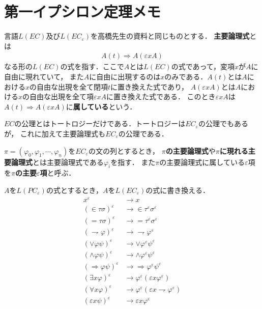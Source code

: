 \section{第一イプシロン定理メモ}
	
	言語$L(EC)$及び$L(EC_{\varepsilon})$を高橋先生の資料と同じものとする．
	{\bf 主要論理式}とは
	\begin{align}
		A(t) \Longrightarrow A(\varepsilon x A)
	\end{align}
	なる形の$L(EC)$の式を指す．ここで$A$とは$L(EC)$の式であって，変項$x$が$A$に自由に現れていて，
	また$A$に自由に出現するのは$x$のみである．$A(t)$とは$A$における$x$の自由な出現を全て閉項$t$に置き換えた式であり，
	$A(\varepsilon x A)$とは$A$における$x$の自由な出現を全て項$\varepsilon x A$に置き換えた式である．
	このとき$\varepsilon x A$は$A(t) \Longrightarrow A(\varepsilon x A)$に{\bf 属している}という．
	
	$EC$の公理とはトートロジーだけである．トートロジーは$EC_{\varepsilon}$の公理でもあるが，
	これに加えて主要論理式も$EC_{\varepsilon}$の公理である．
	
	$\pi = (\varphi_{0},\varphi_{1},\cdots,\varphi_{n})$を$EC_{\varepsilon}$の文の列とするとき，
	{\bf $\pi$の主要論理式}や{\bf $\pi$に現れる主要論理式}とは主要論理式である$\varphi_{i}$を指す．
	また$\pi$の主要論理式に属している$\varepsilon$項を{\bf $\pi$の主要$\varepsilon$項}と呼ぶ．
	
	$A$を$L(PC_{\varepsilon})$の式とするとき，$A$を$L(EC_{\varepsilon})$の式に書き換える．
	\begin{align}
		x^{\varepsilon} &\rightarrow x \\
		(\in \tau \sigma)^{\varepsilon} &\rightarrow \in \tau^{\varepsilon} \sigma^{\varepsilon} \\
		(= \tau \sigma)^{\varepsilon} &\rightarrow = \tau^{\varepsilon} \sigma^{\varepsilon} \\
		(\rightharpoondown \varphi)^{\varepsilon} &\rightarrow \rightharpoondown \varphi^{\varepsilon} \\
		(\vee \varphi \psi)^{\varepsilon} &\rightarrow \vee \varphi^{\varepsilon} \psi^{\varepsilon} \\
		(\wedge \varphi \psi)^{\varepsilon} &\rightarrow \wedge \varphi^{\varepsilon} \psi^{\varepsilon} \\
		(\Longrightarrow \varphi \psi)^{\varepsilon} &\rightarrow \Longrightarrow \varphi^{\varepsilon} \psi^{\varepsilon} \\
		(\exists x \varphi)^{\varepsilon} &\rightarrow \varphi^{\varepsilon}(\varepsilon x \varphi^{\varepsilon}) \\
		(\forall x \varphi)^{\varepsilon} &\rightarrow \varphi^{\varepsilon}(\varepsilon x \rightharpoondown \varphi^{\varepsilon}) \\
		(\varepsilon x \psi)^{\varepsilon} &\rightarrow \varepsilon x \varphi^{\varepsilon}
	\end{align}
	
